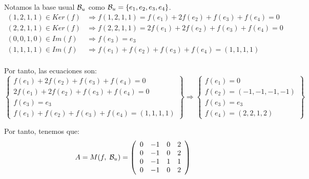 \documentclass[12pt]{article}
\begin{document}
\begin{ejercicio}
\begin{enumerate}
        Notamos la base usual $\mathcal{B}_u$ como $\mathcal{B}_u=\{e_1,e_2,e_3,e_4\}$.
        \begin{equation*}\begin{split}
            (1,2,1,1)\in Ker(f) & \Longrightarrow f(1,2,1,1)=f(e_1) + 2f(e_2) + f(e_3) + f(e_4)=0\\
            (2,2,1,1)\in Ker(f) & \Longrightarrow f(2,2,1,1)=2f(e_1) + 2f(e_2) + f(e_3) + f(e_4)=0\\
            (0,0,1,0)\in Im(f) & \Longrightarrow f(e_3)=e_3\\
            (1,1,1,1)\in Im(f) & \Longrightarrow f(e_1)+f(e_2)+f(e_3)+f(e_4)=(1,1,1,1)\\
        \end{split}\end{equation*}

        Por tanto, las ecuaciones son:
        \begin{equation*}
            \left\{\begin{array}{l}
                f(e_1) + 2f(e_2) + f(e_3) + f(e_4)=0\\
                2f(e_1) + 2f(e_2) + f(e_3) + f(e_4)=0 \\
                f(e_3)=e_3 \\
                f(e_1)+f(e_2)+f(e_3)+f(e_4)=(1,1,1,1)
            \end{array}\right\}\Longrightarrow
            \left\{\begin{array}{l}
                f(e_1)=0\\
                f(e_2)=(-1,-1,-1,-1) \\
                f(e_3)=e_3 \\
                f(e_4)=(2,2,1,2)
            \end{array}\right\}
        \end{equation*}

        Por tanto, tenemos que:
        \begin{equation*}
            A=M(f,\;\mathcal{B}_u)=\left(\begin{array}{cccc}
                0 & -1 & 0 & 2 \\
                0 & -1 & 0 & 2 \\
                0 & -1 & 1 & 1 \\
                0 & -1 & 0 & 2 \\
            \end{array}\right)
        \end{equation*}


\end{enumerate}
\end{ejercicio}
\end{document}
